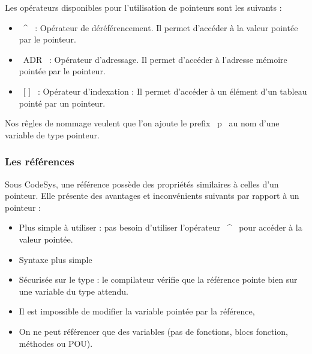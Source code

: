 Les opérateurs disponibles pour l'utilisation de pointeurs sont les suivants : 
\begin{itemize}
    \item ~^~ : Opérateur de déréférencement. Il permet d'accéder à la valeur pointée par le pointeur. 
    \item ~ADR~ : Opérateur d'adressage. Il permet d'accéder à l'adresse mémoire pointée par le pointeur.
    \item ~[ ]~ : Opérateur d'indexation : Il permet d'accéder à un élément d'un tableau pointé par un pointeur.
\end{itemize}

Nos rêgles de nommage veulent que l'on ajoute le prefix ~p~ au nom d'une variable de type pointeur.


\subsubsection{Les références}
Sous CodeSys, une référence possède des propriétés similaires à celles d'un pointeur. Elle présente des avantages et inconvénients suivants par rapport à un pointeur :
\begin{minipage} [t]{0.45\linewidth}
    \begin{itemize}
        \item Plus simple à utiliser : pas besoin d'utiliser l'opérateur ~^~ pour accéder à la valeur pointée.
        \item Syntaxe plus simple
        \item Sécurisée sur le type : le compilateur vérifie que la référence pointe bien sur une variable du type attendu.
    \end{itemize}
    
\end{minipage}\hfill
\begin{minipage} [t]{0.45\linewidth}
    \begin{itemize}
        \item Il est impossible de modifier la variable pointée par la référence,
        \item On ne peut référencer que des variables (pas de fonctions, blocs fonction, méthodes ou POU).
    \end{itemize}
\end{minipage}

